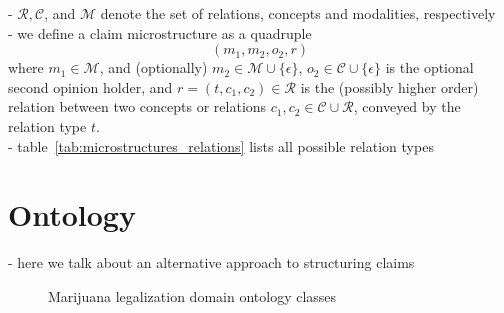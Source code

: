 \noindent - $\mathcal{R}, \mathcal{C}$, and $\mathcal{M}$ denote the set of relations, concepts and
modalities, respectively \\
- we define a claim microstructure as a quadruple 
$$
(m_1, m_2, o_2, r)
$$ 
where $m_1 \in \mathcal{M}$, and (optionally) $m_2 \in \mathcal{M} \cup \{\epsilon\}$,
$o_2 \in \mathcal{C} \cup \{\epsilon\}$ is the optional second opinion holder, and 
$r = (t, c_1, c_2) \in \mathcal{R}$ is the (possibly higher order) relation 
between two concepts or relations $c_1, c_2 \in \mathcal{C} \cup \mathcal{R}$, 
conveyed by the relation type $t$. \\
- table~\ref{tab:microstructures_relations} lists all possible relation types \\

\section{Ontology}

- here we talk about an alternative approach to structuring claims \\


\begin{figure}
	\centering
{}
\caption{Marijuana legalization domain ontology classes}
\label{fig:marijuana_domain_ontology}
\end{figure}

